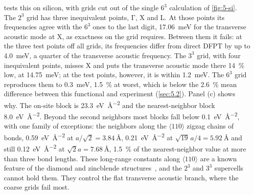  tests this on silicon, with grids cut out of the single $6^3$ calculation of \cref{fig:5-si}. The $2^3$ grid has three inequivalent points, $\mathrm{\Gamma}$, X and L. At those points its frequencies agree with the $6^3$ ones to the last digit, \SI{17.06}{meV} for the transverse acoustic mode at X, as exactness on the grid requires. Between them it fails: at the three test points off all grids, its frequencies differ from direct DFPT by up to \SI{4.0}{meV}, a quarter of the transverse acoustic frequency. The $3^3$ grid, with four inequivalent points, misses X and puts the transverse acoustic mode there \SI{14}{\percent} low, at \SI{14.75}{meV}; at the test points, however, it is within \SI{1.2}{meV}. The $6^3$ grid reproduces them to \SI{0.3}{meV}, \SI{1.5}{\percent} at worst, which is below the \SI{2.6}{\percent} mean difference between this functional and experiment (\cref{sec:5.2}). Panel (c) shows why. The on-site block is \SI{23.3}{eV.\angstrom^{-2}} and the nearest-neighbor block \SI{8.0}{eV.\angstrom^{-2}}. Beyond the second neighbors most blocks fall below \SI{0.1}{eV.\angstrom^{-2}}, with one family of exceptions: the neighbors along the $\langle110\rangle$ zigzag chains of bonds, \SI{0.59}{eV.\angstrom^{-2}} at $a/\sqrt2 = \SI{3.84}{\angstrom}$, \SI{0.21}{eV.\angstrom^{-2}} at $\sqrt{19}\,a/4 = \SI{5.92}{\angstrom}$ and still \SI{0.12}{eV.\angstrom^{-2}} at $\sqrt2a = \SI{7.68}{\angstrom}$, \SI{1.5}{\percent} of the nearest-neighbor value at more than three bond lengths. These long-range constants along $\langle110\rangle$ are a known feature of the diamond and zincblende structures~\cite[Sect.~V.A.1]{baroni2001phonons}, and the $2^3$ and $3^3$ supercells cannot hold them. They control the flat transverse acoustic branch, where the coarse grids fail most.

